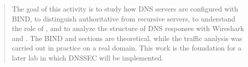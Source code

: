 \begin{abstract}
The goal of this activity is to study how DNS servers are configured with BIND, to distinguish authoritative from recursive servers, to understand the role of , and to analyze the structure of DNS responses with Wireshark and . The BIND and  sections are theoretical, while the traffic analysis was carried out in practice on a real domain. This work is the foundation for a later lab in which DNSSEC will be implemented.
\end{abstract}
